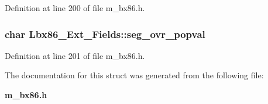 Definition at line 200 of file m\_\-bx86.h.
\subsubsection{\setlength{\rightskip}{0pt plus 5cm}char \bf{Lbx86\_\-Ext\_\-Fields::seg\_\-ovr\_\-popval}}\label{structLbx86__Ext__Fields_f17c03f6489eef3909b5d1692bac2458}




Definition at line 201 of file m\_\-bx86.h.

The documentation for this struct was generated from the following file:\begin{CompactItemize}
\item 
\bf{m\_\-bx86.h}\end{CompactItemize}
